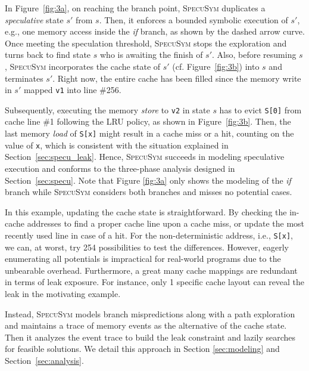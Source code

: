\documentclass[sigconf]{acmart}
\newcommand\ignore[1]{}
\newcommand{\SpecuSym}{\textsc{SpecuSym} }
\begin{document}
In Figure~\ref{fig:3a}, on reaching the branch point, \SpecuSym duplicates a 
\textit{speculative} state $s'$ from $s$. Then, it enforces a bounded symbolic 
execution of $s'$, e.g., one memory access inside the \textit{if} branch, as 
shown by the dashed arrow curve. Once meeting the speculation threshold, 
\SpecuSym stops the exploration and turns back to find state $s$ who is awaiting 
the finish of $s'$. Also, before resuming $s$, \SpecuSym incorporates the cache 
state of $s'$ (cf. Figure~\ref{fig:3b}) into $s$ and terminates $s'$. Right now, 
the entire cache has been filled since the memory write in $s'$ mapped \texttt{v1} 
into line \#256. 


Subsequently, executing the memory \emph{store} to \texttt{v2} in state $s$ has
to evict \texttt{S[0]} from cache line \#1 following the LRU policy, as shown in 
Figure~\ref{fig:3b}. Then, the last memory \emph{load} of \texttt{S[x]} might 
result in a cache miss or a hit, counting on the value of \texttt{x}, which is 
consistent with the situation explained in Section~\ref{sec:specu_leak}. Hence, 
\SpecuSym succeeds in modeling speculative execution and conforms to the 
three-phase analysis designed in Section~\ref{sec:specu}. Note that Figure
\ref{fig:3a} only shows the modeling of the \emph{if} branch while \SpecuSym 
considers both branches and misses no potential cases. 


\ignore{
In Figure~\ref{fig:3a}, the speculative state $s'$ inherits the cache 
state from $s$, maps \texttt{v2} into a cache line, and merges back the updated 
cache state to state $s$ before its termination, as formally stated in Algorithm
\ref{alg:specusym} (lines 23-25). 
}


In this example, updating the cache state is straightforward. By checking the 
in-cache addresses to find a proper cache line upon a cache miss, or update the 
most recently used line in case of a hit. For the non-deterministic address, i.e., 
\texttt{S[x]}, we can, at worst, try 254 possibilities to test the differences. 
However, eagerly enumerating all potentials is impractical for real-world programs 
due to the unbearable overhead. Furthermore, a great many cache mappings are
redundant in terms of leak exposure. For instance, only 1 specific cache layout 
can reveal the leak in the motivating example. 


Instead, \SpecuSym models branch mispredictions along with a path exploration
and maintains a trace of memory events as the alternative of the cache state. 
Then it analyzes the event trace to build the leak constraint and lazily 
searches for feasible solutions. We detail this approach in Section
\ref{sec:modeling} and Section~\ref{sec:analysis}. 
\end{document}
